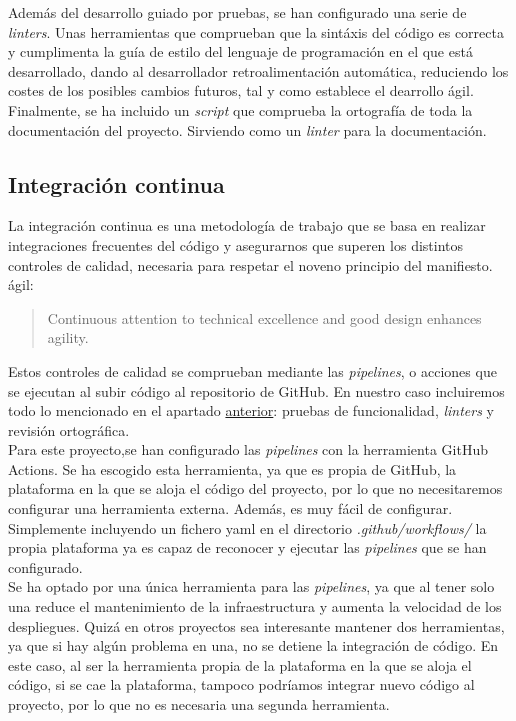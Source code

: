 Además del desarrollo guiado por pruebas, se han configurado una serie de \textit{linters}. Unas herramientas que
comprueban que la sintáxis del código es correcta y cumplimenta la guía de estilo del lenguaje de programación en el
que está desarrollado, dando al desarrollador retroalimentación automática, reduciendo los costes de los posibles
cambios futuros, tal y como establece el dearrollo ágil.\\

Finalmente, se ha incluido un \textit{script} que comprueba la ortografía de toda la documentación del proyecto.
Sirviendo como un \textit{linter} para la documentación.\\

\subsection{Integración continua}

La integración continua es una metodología de trabajo que se basa en realizar integraciones frecuentes del código y
asegurarnos que superen los distintos controles de calidad, necesaria para respetar el noveno principio del manifiesto.
ágil:
\begin{quote}
    Continuous attention to technical excellence and good design enhances agility.
\end{quote}


Estos controles de calidad se comprueban mediante las \textit{pipelines}, o acciones que se ejecutan al subir código
al repositorio de GitHub. En nuestro caso incluiremos todo lo mencionado en el apartado
\hyperref[sec:control_de_calidad]{anterior}: pruebas de funcionalidad, \textit{linters} y revisión ortográfica.\\

Para este proyecto,se han configurado las \textit{pipelines} con la herramienta GitHub Actions. Se ha escogido esta
herramienta, ya que es propia de GitHub, la plataforma en la que se aloja el código del proyecto, por lo que no
necesitaremos configurar una herramienta externa. Además, es muy fácil de configurar. Simplemente incluyendo un fichero
yaml en el directorio \textit{.github/workflows/} la propia plataforma ya es capaz de reconocer y ejecutar las
\textit{pipelines} que se han configurado.\\

Se ha optado por una única herramienta para las \textit{pipelines}, ya que al tener solo una reduce el mantenimiento de
la infraestructura y aumenta la velocidad de los despliegues. Quizá en otros proyectos sea interesante mantener dos
herramientas, ya que si hay algún problema en una, no se detiene la integración de código. En este caso, al ser la
herramienta propia de la plataforma en la que se aloja el código, si se cae la plataforma, tampoco podríamos integrar
nuevo código al proyecto, por lo que no es necesaria una segunda herramienta.

